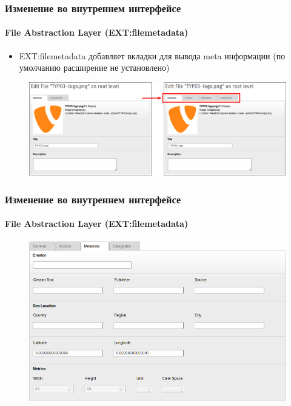 
\begin{frame}[fragile]
	\frametitle{Изменение во внутреннем интерфейсе}
	\framesubtitle{File Abstraction Layer (EXT:filemetadata)}

	\begin{itemize}
		\item EXT:filemetadata добавляет вкладки для вывода meta информации\newline
			\small(по умолчанию расширение не установлено)\normalsize
	\end{itemize}

	\begin{figure}
		\includegraphics[width=0.95\linewidth]{Images/BackendChanges/FileMetaDataTabs.png}
	\end{figure}

\end{frame}


\begin{frame}[fragile]
	\frametitle{Изменение во внутреннем интерфейсе}
	\framesubtitle{File Abstraction Layer (EXT:filemetadata)}

	\begin{figure}
		\includegraphics[width=0.8\linewidth]{Images/BackendChanges/FileMetaData.png}
	\end{figure}

\end{frame}



